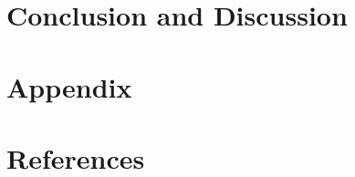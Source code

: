 \documentclass[
	11pt, %
]{beamer}
\begin{document}
\section{Conclusion and Discussion} %



\section{Appendix} %

\section{References} %

% 
\end{document}
